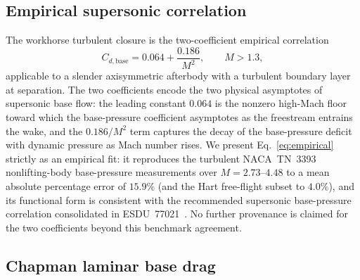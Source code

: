 \subsection{Empirical supersonic correlation}
\label{subsec:empirical}

The workhorse turbulent closure is the two-coefficient empirical correlation
%
\begin{equation}
C_{d,\text{base}} = 0.064 + \frac{0.186}{M^{2}}, \qquad M > 1.3 ,
\label{eq:empirical}
\end{equation}
%
applicable to a slender axisymmetric afterbody with a turbulent boundary layer at
separation. The two coefficients encode the two physical asymptotes of supersonic
base flow: the leading constant $0.064$ is the nonzero high-Mach floor toward
which the base-pressure coefficient asymptotes as the freestream entrains the
wake, and the $0.186/M^{2}$ term captures the decay of the base-pressure deficit
with dynamic pressure as Mach number rises. We present
Eq.~\eqref{eq:empirical} strictly as an empirical fit: it reproduces the
turbulent NACA~TN~3393~\cite{chapman1955} nonlifting-body base-pressure
measurements over $M = 2.73$--$4.48$ to a mean absolute percentage error of
$15.9\%$ (and the Hart free-flight subset to $4.0\%$), and its functional form is
consistent with the recommended supersonic base-pressure correlation
consolidated in ESDU~77021~\cite{esdu77021}. No further provenance is claimed for
the two coefficients beyond this benchmark agreement.

\subsection{Chapman laminar base drag}
\label{subsec:laminar}

